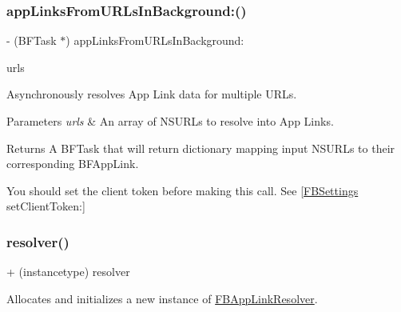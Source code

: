 \subsubsection{\texorpdfstring{app\+Links\+From\+U\+R\+Ls\+In\+Background\+:()}{appLinksFromURLsInBackground:()}\hspace{0.1cm}{\footnotesize\ttfamily [5/5]}}
{\footnotesize\ttfamily -\/ (B\+F\+Task $\ast$) app\+Links\+From\+U\+R\+Ls\+In\+Background\+: \begin{DoxyParamCaption}\item[{(N\+S\+Array $\ast$)}]{urls }\end{DoxyParamCaption}}

Asynchronously resolves App Link data for multiple U\+R\+Ls.


\begin{DoxyParams}{Parameters}
{\em urls} & An array of N\+S\+U\+R\+Ls to resolve into App Links. \\
\hline
\end{DoxyParams}
\begin{DoxyReturn}{Returns}
A B\+F\+Task that will return dictionary mapping input N\+S\+U\+R\+Ls to their corresponding B\+F\+App\+Link.
\end{DoxyReturn}
You should set the client token before making this call. See {\ttfamily \mbox{[}\hyperlink{interfaceFBSettings}{F\+B\+Settings} set\+Client\+Token\+:\mbox{]}} \mbox{\label{interfaceFBAppLinkResolver_a2012888799cc3416e4c6d01e1a18f90b}} 
\subsubsection{\texorpdfstring{resolver()}{resolver()}\hspace{0.1cm}{\footnotesize\ttfamily [1/5]}}
{\footnotesize\ttfamily + (instancetype) resolver \begin{DoxyParamCaption}{ }\end{DoxyParamCaption}}

Allocates and initializes a new instance of \hyperlink{interfaceFBAppLinkResolver}{F\+B\+App\+Link\+Resolver}. \mbox{\label{interfaceFBAppLinkResolver_a2012888799cc3416e4c6d01e1a18f90b}} 
